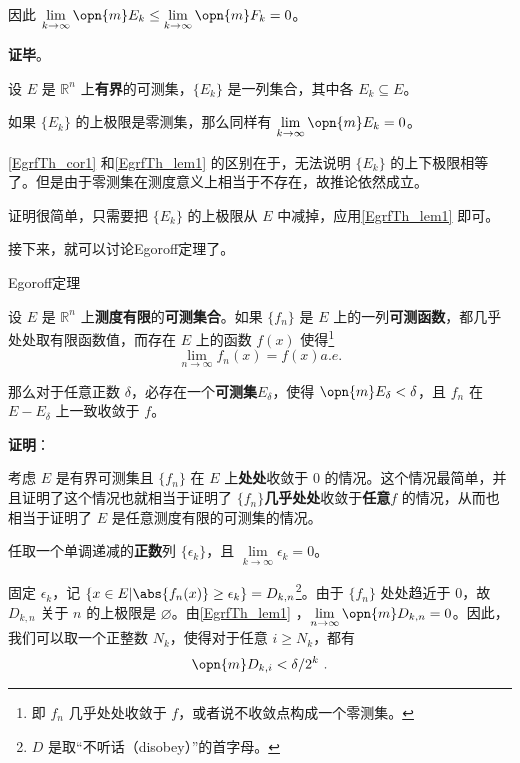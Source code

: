 因此 $\lim\limits_{k\to\infty}\opn{m}E_k\leq\lim\limits_{k\to\infty}\opn{m}F_k=0$。


\textbf{证毕}。

\begin{corollary}{}\label{EgrfTh_cor1}
设 $E$ 是 $\mathbb{R}^n$ 上\textbf{有界}的可测集，$\{E_k\}$ 是一列集合，其中各 $E_k\subseteq E$。

如果 $\{E_k\}$ 的上极限是零测集，那么同样有 $\lim\limits_{k\to\infty}\opn{m}E_k=0$。
\end{corollary}

\autoref{EgrfTh_cor1} 和\autoref{EgrfTh_lem1} 的区别在于，无法说明 $\{E_k\}$ 的上下极限相等了。但是由于零测集在测度意义上相当于不存在，故推论依然成立。

证明很简单，只需要把 $\{E_k\}$ 的上极限从 $E$ 中减掉，应用\autoref{EgrfTh_lem1} 即可。





接下来，就可以讨论Egoroff定理了。


\begin{theorem}{Egoroff定理}\label{EgrfTh_the1}

设 $E$ 是 $\mathbb{R}^n$ 上\textbf{测度有限}的\textbf{可测集合}。如果 $\{f_n\}$ 是 $E$ 上的一列\textbf{可测函数}，都几乎处处取有限函数值，而存在 $E$ 上的函数 $f(x)$ 使得\footnote{即 $f_n$ 几乎处处收敛于 $f$，或者说不收敛点构成一个零测集。}\begin{equation}
\lim\limits_{n\to\infty}f_n(x)=f(x)a. e. 
\end{equation}

那么对于任意正数 $\delta$，必存在一个\textbf{可测集}$E_\delta$，使得 $\opn{m}E_\delta<\delta$，且 $f_n$ 在 $E-E_\delta$ 上一致收敛于 $f$。

\end{theorem}

\textbf{证明}：

考虑 $E$ 是有界可测集且 $\{f_n\}$ 在 $E$ 上\textbf{处处}收敛于 $0$ 的情况。这个情况最简单，并且证明了这个情况也就相当于证明了 $\{f_n\}$\textbf{几乎处处}收敛于\textbf{任意}$f$ 的情况，从而也相当于证明了 $E$ 是任意测度有限的可测集的情况。



任取一个单调递减的\textbf{正数}列 $\{\epsilon_k\}$，且 $\lim\limits_{k\to\infty}\epsilon_k=0$。

固定 $\epsilon_k$，记 $\{x\in E|\abs{f_n(x)}\geq\epsilon_k\}=D_{k, n}$\footnote{$D$ 是取“不听话（disobey）”的首字母。}。由于 $\{f_n\}$ 处处趋近于 $0$，故 $D_{k, n}$ 关于 $n$ 的上极限是 $\varnothing$。由\autoref{EgrfTh_lem1} ，$\lim\limits_{n\to\infty}\opn{m}D_{k, n}=0$。因此，我们可以取一个正整数 $N_k$，使得对于任意 $i\geq N_k$，都有
\begin{equation}\label{EgrfTh_eq2}
\opn{m}D_{k, i}<\delta/2^k~.
\end{equation}

